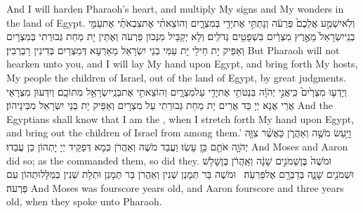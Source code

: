 {And I will harden Pharaoh’s heart, and multiply My signs and My wonders in the land of Egypt.}{}
{וְלֹֽא\maqqaf יִשְׁמַ֤ע אֲלֵכֶם֙ פַּרְעֹ֔ה וְנָתַתִּ֥י אֶת\maqqaf יָדִ֖י בְּמִצְרָ֑יִם וְהוֹצֵאתִ֨י אֶת\maqqaf צִבְאֹתַ֜י אֶת\maqqaf עַמִּ֤י בְנֵֽי\maqqaf יִשְׂרָאֵל֙ מֵאֶ֣רֶץ מִצְרַ֔יִם בִּשְׁפָטִ֖ים גְּדֹלִֽים׃}
{וְלָא יְקַבֵּיל מִנְּכוֹן פַּרְעֹה וְאֶתֵּין יָת מַחַת גְּבוּרְתִי בְּמִצְרָיִם וְאַפֵּיק יָת חֵילַי יָת עַמִּי בְנֵי יִשְׂרָאֵל מֵאַרְעָא דְּמִצְרַיִם בְּדִינִין רַבְרְבִין׃}
{But Pharaoh will not hearken unto you, and I will lay My hand upon Egypt, and bring forth My hosts, My people the children of Israel, out of the land of Egypt, by great judgments.}{}
{וְיָדְע֤וּ מִצְרַ֙יִם֙ כִּֽי\maqqaf אֲנִ֣י יְהֹוָ֔ה בִּנְטֹתִ֥י אֶת\maqqaf יָדִ֖י עַל\maqqaf מִצְרָ֑יִם וְהוֹצֵאתִ֥י אֶת\maqqaf בְּנֵֽי\maqqaf יִשְׂרָאֵ֖ל מִתּוֹכָֽם׃}
{וְיִדְּעוּן מִצְרָאֵי אֲרֵי אֲנָא יְיָ כַּד אֲרֵים יָת מַחַת גְּבוּרְתִי עַל מִצְרָיִם וְאַפֵּיק יָת בְּנֵי יִשְׂרָאֵל מִבֵּינֵיהוֹן׃}
{And the Egyptians shall know that I am the \lord, when I stretch forth My hand upon Egypt, and bring out the children of Israel from among them.’}{}
{וַיַּ֥עַשׂ מֹשֶׁ֖ה וְאַהֲרֹ֑ן כַּאֲשֶׁ֨ר צִוָּ֧ה יְהֹוָ֛ה אֹתָ֖ם כֵּ֥ן עָשֽׂוּ׃}
{וַעֲבַד מֹשֶׁה וְאַהֲרֹן כְּמָא דְּפַקֵּיד יְיָ יָתְהוֹן כֵּן עֲבַדוּ׃}
{And Moses and Aaron did so; as the \lord\space commanded them, so did they.}{}
{וּמֹשֶׁה֙ בֶּן\maqqaf שְׁמֹנִ֣ים שָׁנָ֔ה וְאַֽהֲרֹ֔ן בֶּן\maqqaf שָׁלֹ֥שׁ וּשְׁמֹנִ֖ים שָׁנָ֑ה בְּדַבְּרָ֖ם אֶל\maqqaf פַּרְעֹֽה׃ \petucha }
{וּמֹשֶׁה בַּר תְּמָנַן שְׁנִין וְאַהֲרֹן בַּר תְּמָנַן וּתְלָת שְׁנִין בְּמַלָּלוּתְהוֹן עִם פַּרְעֹה׃}
{And Moses was fourscore years old, and Aaron fourscore and three years old, when they spoke unto Pharaoh.}{}
